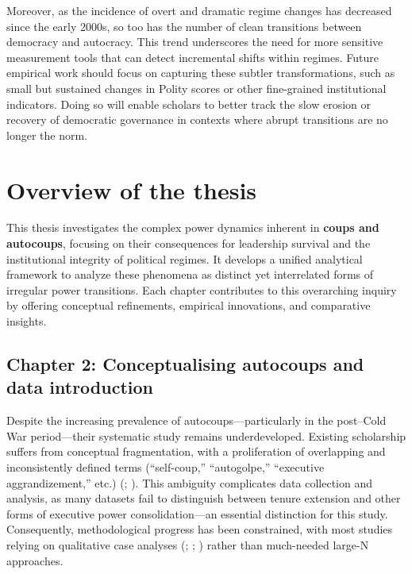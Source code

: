 \documentclass[
  12pt,
]{report}
\begin{document}
Moreover, as the incidence of overt and dramatic regime changes has
decreased since the early 2000s, so too has the number of clean
transitions between democracy and autocracy. This trend underscores the
need for more sensitive measurement tools that can detect incremental
shifts within regimes. Future empirical work should focus on capturing
these subtler transformations, such as small but sustained changes in
Polity scores or other fine-grained institutional indicators. Doing so
will enable scholars to better track the slow erosion or recovery of
democratic governance in contexts where abrupt transitions are no longer
the norm.

\section{Overview of the thesis}\label{overview-of-the-thesis}

This thesis investigates the complex power dynamics inherent in
\textbf{coups and autocoups}, focusing on their consequences for
leadership survival and the institutional integrity of political
regimes. It develops a unified analytical framework to analyze these
phenomena as distinct yet interrelated forms of irregular power
transitions. Each chapter contributes to this overarching inquiry by
offering conceptual refinements, empirical innovations, and comparative
insights.

\subsection*{Chapter 2: Conceptualising autocoups and data
introduction}\label{chapter-2-conceptualising-autocoups-and-data-introduction}

Despite the increasing prevalence of autocoups---particularly in the
post--Cold War period---their systematic study remains underdeveloped.
Existing scholarship suffers from conceptual fragmentation, with a
proliferation of overlapping and inconsistently defined terms
(``self-coup,'' ``autogolpe,'' ``executive aggrandizement,'' etc.)
(;
). This ambiguity
complicates data collection and analysis, as many datasets fail to
distinguish between tenure extension and other forms of executive power
consolidation---an essential distinction for this study. Consequently,
methodological progress has been constrained, with most studies relying
on qualitative case analyses (; ;
)
rather than much-needed large-N approaches.
\end{document}
